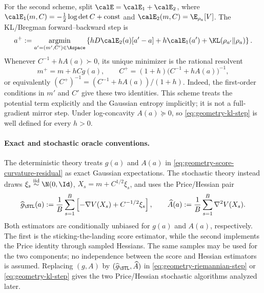 For the second scheme, split
$\calE=\calE_1+\calE_2$, where
$\calE_1(m,C)=-\frac12\log\det C+\mathrm{const}$ and
$\calE_2(m,C)=\E_{\rho_a}[V]$.  The KL/Bregman forward--backward step is
\begin{equation}
\label{eq:geometry-kl-prox}
    a^+
    :=\underset{a'=(m',C')\in\Aspace}{\operatorname{argmin}}
      \left\{
        hD\calE_2(a)[a'-a]+h\calE_1(a')
        +\KL(\rho_{a'}\|\rho_a)
      \right\}.
\end{equation}
Whenever $C^{-1}+hA(a)\succ0$, its unique minimizer is the rational
resolvent
\begin{equation}
\label{eq:geometry-kl-step}
    m^+=m+hCg(a),
    \qquad
    C^+=(1+h)\bigl(C^{-1}+hA(a)\bigr)^{-1},
\end{equation}
or equivalently
$(C^+)^{-1}=(C^{-1}+hA(a))/(1+h)$.  Indeed, the first-order conditions in
$m'$ and $C'$ give these two identities.  This scheme treats the potential
term explicitly and the Gaussian entropy implicitly; it is not a
full-gradient mirror step.  Under log-concavity $A(a)\succeq0$, so
\eqref{eq:geometry-kl-step} is well defined for every $h>0$.

\paragraph{Exact and stochastic oracle conventions.}
The deterministic theory treats $g(a)$ and $A(a)$ in
\eqref{eq:geometry-score-curvature-residual} as exact Gaussian expectations.
The stochastic theory instead draws
$\xi_s\overset{\mathrm{iid}}\sim\N(0,\Id)$,
$X_s=m+C^{1/2}\xi_s$, and uses the Price/Hessian pair
\begin{equation}
\label{eq:geometry-stochastic-oracles}
    \widehat g_{\STL}(a)
    :=\frac1B\sum_{s=1}^B
       \left[-\nabla V(X_s)+C^{-1/2}\xi_s\right],
    \qquad
    \widehat A(a)
    :=\frac1B\sum_{s=1}^B\nabla^2V(X_s).
\end{equation}
Both estimators are conditionally unbiased for $g(a)$ and $A(a)$,
respectively.  The first is the sticking-the-landing score estimator, while
the second implements the Price identity through sampled Hessians.  The same
samples may be used for the two components; no independence between the
score and Hessian estimators is assumed.  Replacing $(g,A)$ by
$(\widehat g_{\STL},\widehat A)$ in
\eqref{eq:geometry-riemannian-step} or \eqref{eq:geometry-kl-step} gives the
two Price/Hessian stochastic algorithms analyzed later.
